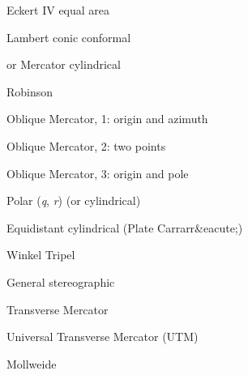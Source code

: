 \documentclass{article}
\begin{document}
\par 	{}	Eckert IV equal area\par 

\par 	{}	Lambert conic conformal\par 

\par 	{}or{\it }	Mercator cylindrical\par 

\par 	{}	Robinson\par 

\par 	{}	Oblique Mercator, 1:	origin and azimuth\par 

\par 	{}	Oblique Mercator, 2:	two points\par 

\par 	{}	Oblique Mercator, 3:	origin and pole\par 

\par 	{}	Polar ({\it q}, {\it r}) (or cylindrical)\par 

\par 	{}	Equidistant cylindrical (Plate Carrarr\&eacute;)\par 

\par 	{}	Winkel Tripel\par 

\par 	{}	General stereographic\par 

\par 	{}	Transverse Mercator\par 

\par 	{}	Universal Transverse Mercator (UTM)\par 

\par 	{}	Mollweide\par 
\end{document}
